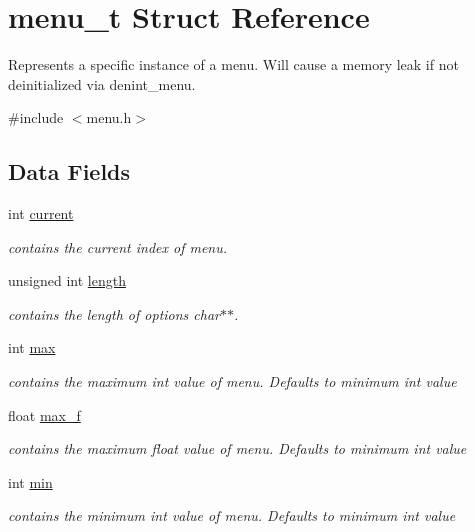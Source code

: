 \hypertarget{structmenu__t}{}\section{menu\+\_\+t Struct Reference}
\label{structmenu__t}


Represents a specific instance of a menu. Will cause a memory leak if not deinitialized via denint\+\_\+menu.  




{\ttfamily \#include $<$menu.\+h$>$}

\subsection*{Data Fields}
\begin{DoxyCompactItemize}
\item 
int \hyperlink{structmenu__t_a2acb18066898677ec5e2dc40eec811c5}{current}
\begin{DoxyCompactList}\small\item\em contains the current index of menu. \end{DoxyCompactList}\item 
unsigned int \hyperlink{structmenu__t_a023063461c4a247e574abd6a55faf765}{length}
\begin{DoxyCompactList}\small\item\em contains the length of options char$\ast$$\ast$. \end{DoxyCompactList}\item 
int \hyperlink{structmenu__t_ace9cbaecd7bf311be0ef230da657f406}{max}
\begin{DoxyCompactList}\small\item\em contains the maximum int value of menu. Defaults to minimum int value \end{DoxyCompactList}\item 
float \hyperlink{structmenu__t_a14b11d0a7610484462c8a6e93068a2c1}{max\+\_\+f}
\begin{DoxyCompactList}\small\item\em contains the maximum float value of menu. Defaults to minimum int value \end{DoxyCompactList}\item 
int \hyperlink{structmenu__t_a6891bc6c94f1e995cc62a05b13328de5}{min}
\begin{DoxyCompactList}\small\item\em contains the minimum int value of menu. Defaults to minimum int value \end{DoxyCompactList}\item 

\end{DoxyCompactItemize}

